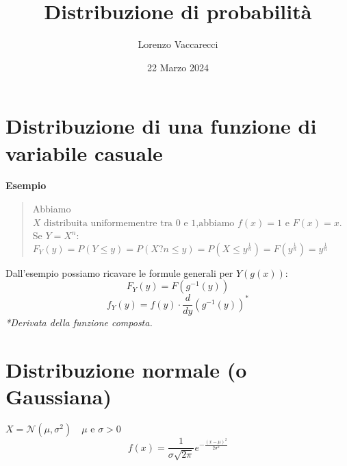 \documentclass[12pt]{article}
\title{Distribuzione di probabilità}
\author{Lorenzo Vaccarecci}
\date{22 Marzo 2024}
\begin{document}
\maketitle
\section{Distribuzione di una funzione di variabile casuale}
\textbf{Esempio}
\begin{quote}
Abbiamo $X \text{ distribuita uniformementre tra 0 e 1,abbiamo } f(x)=1 \text{ e } F(x)=x$. Se $Y=X^{n}:$\\
\(
  F_{Y}(y)=P(Y\leq y)=P(X?{n}\leq y)=P(X\leq y^{\frac{1}{n}})=F(y^{\frac{1}{n}})=y^{\frac{1}{n}}  
\)
\end{quote}
Dall'esempio possiamo ricavare le formule generali per $Y(g(x))$:
\begin{equation*}
    F_{Y}(y)=F(g^{-1}(y))
\end{equation*}
\begin{equation*}
    f_{Y}(y)=f(y)\cdot \frac{d}{dy}(g^{-1}(y))^{*}
\end{equation*}
\textit{*Derivata della funzione composta.}
\section{Distribuzione normale (o Gaussiana)}
$X=\mathcal{N}(\mu,\sigma^{2})\quad\mu \text{ e } \sigma > 0$
\begin{equation*}
    f(x)=\frac{1}{\sigma \sqrt{2\pi}}e^{-\frac{(x-\mu)^2}{2\sigma^{2}}}
\end{equation*}
\end{document}
